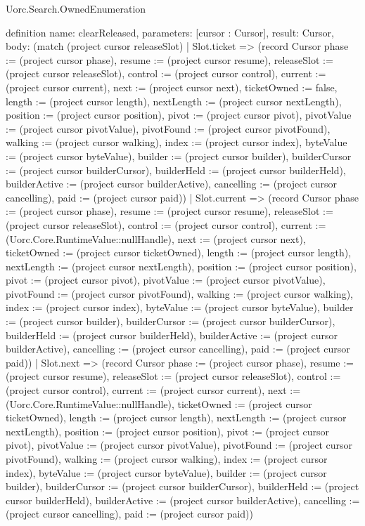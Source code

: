 \begin{lexlean}{Uorc.Search.OwnedEnumeration}
\begin{semanticmodule}
definition{
  name: clearReleased,
  parameters: [cursor : Cursor],
  result: Cursor,
  body: (match (project cursor releaseSlot)
    | Slot.ticket => (record Cursor {phase := (project cursor phase), resume := (project cursor resume), releaseSlot := (project cursor releaseSlot), control := (project cursor control), current := (project cursor current), next := (project cursor next), ticketOwned := false, length := (project cursor length), nextLength := (project cursor nextLength), position := (project cursor position), pivot := (project cursor pivot), pivotValue := (project cursor pivotValue), pivotFound := (project cursor pivotFound), walking := (project cursor walking), index := (project cursor index), byteValue := (project cursor byteValue), builder := (project cursor builder), builderCursor := (project cursor builderCursor), builderHeld := (project cursor builderHeld), builderActive := (project cursor builderActive), cancelling := (project cursor cancelling), paid := (project cursor paid)})
    | Slot.current => (record Cursor {phase := (project cursor phase), resume := (project cursor resume), releaseSlot := (project cursor releaseSlot), control := (project cursor control), current := (Uorc.Core.RuntimeValue::nullHandle), next := (project cursor next), ticketOwned := (project cursor ticketOwned), length := (project cursor length), nextLength := (project cursor nextLength), position := (project cursor position), pivot := (project cursor pivot), pivotValue := (project cursor pivotValue), pivotFound := (project cursor pivotFound), walking := (project cursor walking), index := (project cursor index), byteValue := (project cursor byteValue), builder := (project cursor builder), builderCursor := (project cursor builderCursor), builderHeld := (project cursor builderHeld), builderActive := (project cursor builderActive), cancelling := (project cursor cancelling), paid := (project cursor paid)})
    | Slot.next => (record Cursor {phase := (project cursor phase), resume := (project cursor resume), releaseSlot := (project cursor releaseSlot), control := (project cursor control), current := (project cursor current), next := (Uorc.Core.RuntimeValue::nullHandle), ticketOwned := (project cursor ticketOwned), length := (project cursor length), nextLength := (project cursor nextLength), position := (project cursor position), pivot := (project cursor pivot), pivotValue := (project cursor pivotValue), pivotFound := (project cursor pivotFound), walking := (project cursor walking), index := (project cursor index), byteValue := (project cursor byteValue), builder := (project cursor builder), builderCursor := (project cursor builderCursor), builderHeld := (project cursor builderHeld), builderActive := (project cursor builderActive), cancelling := (project cursor cancelling), paid := (project cursor paid)})
}
\end{semanticmodule}
\end{lexlean}
